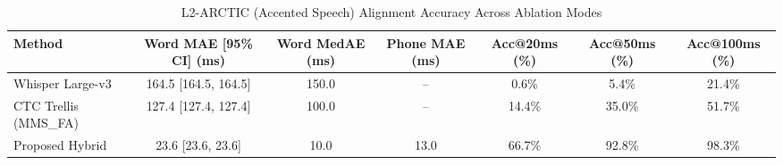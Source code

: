 \begin{table}[t]
\centering
\caption{L2-ARCTIC (Accented Speech) Alignment Accuracy Across Ablation Modes}
\label{tab:alignment_accuracy}
\begin{tabular}{lcccccc}
\toprule
Method & Word MAE [95\% CI] (ms) & Word MedAE (ms) & Phone MAE (ms) & Acc@20ms (\%) & Acc@50ms (\%) & Acc@100ms (\%) \\
\midrule
Whisper Large-v3 & 164.5 [164.5, 164.5] & 150.0 & -- & 0.6\% & 5.4\% & 21.4\% \\
CTC Trellis (MMS\_FA) & 127.4 [127.4, 127.4] & 100.0 & -- & 14.4\% & 35.0\% & 51.7\% \\
Proposed Hybrid & 23.6 [23.6, 23.6] & 10.0 & 13.0 & 66.7\% & 92.8\% & 98.3\% \\
\bottomrule
\end{tabular}
\end{table}
